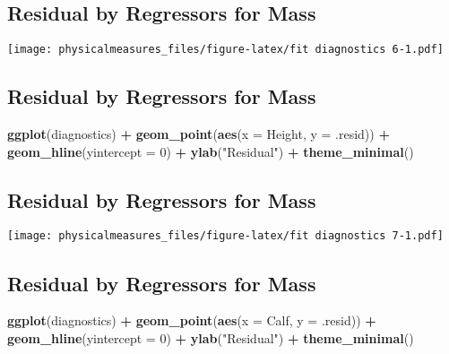 \documentclass[]{article}
\newenvironment{Shaded}{\begin{snugshade}}{\end{snugshade}}
\newcommand{\KeywordTok}[1]{\textcolor[rgb]{0.13,0.29,0.53}{\textbf{#1}}}
\newcommand{\DataTypeTok}[1]{\textcolor[rgb]{0.13,0.29,0.53}{#1}}
\newcommand{\DecValTok}[1]{\textcolor[rgb]{0.00,0.00,0.81}{#1}}
\newcommand{\StringTok}[1]{\textcolor[rgb]{0.31,0.60,0.02}{#1}}
\newcommand{\OperatorTok}[1]{\textcolor[rgb]{0.81,0.36,0.00}{\textbf{#1}}}
\newcommand{\NormalTok}[1]{#1}
\begin{document}
\subsection{Residual by Regressors for
Mass}\label{residual-by-regressors-for-mass-11}

\texttt{[image: physicalmeasures\_files/figure-latex/fit diagnostics 6-1.pdf]}

\subsection{Residual by Regressors for
Mass}\label{residual-by-regressors-for-mass-12}

\begin{Shaded}
\begin{Highlighting}[]
\KeywordTok{ggplot}\NormalTok{(diagnostics) }\OperatorTok{+}
\StringTok{  }\KeywordTok{geom_point}\NormalTok{(}\KeywordTok{aes}\NormalTok{(}\DataTypeTok{x =}\NormalTok{ Height, }\DataTypeTok{y =}\NormalTok{ .resid)) }\OperatorTok{+}
\StringTok{  }\KeywordTok{geom_hline}\NormalTok{(}\DataTypeTok{yintercept =} \DecValTok{0}\NormalTok{) }\OperatorTok{+}
\StringTok{  }\KeywordTok{ylab}\NormalTok{(}\StringTok{"Residual"}\NormalTok{) }\OperatorTok{+}
\StringTok{  }\KeywordTok{theme_minimal}\NormalTok{()}
\end{Highlighting}
\end{Shaded}

\subsection{Residual by Regressors for
Mass}\label{residual-by-regressors-for-mass-13}

\texttt{[image: physicalmeasures\_files/figure-latex/fit diagnostics 7-1.pdf]}

\subsection{Residual by Regressors for
Mass}\label{residual-by-regressors-for-mass-14}

\begin{Shaded}
\begin{Highlighting}[]
\KeywordTok{ggplot}\NormalTok{(diagnostics) }\OperatorTok{+}
\StringTok{  }\KeywordTok{geom_point}\NormalTok{(}\KeywordTok{aes}\NormalTok{(}\DataTypeTok{x =}\NormalTok{ Calf, }\DataTypeTok{y =}\NormalTok{ .resid)) }\OperatorTok{+}
\StringTok{  }\KeywordTok{geom_hline}\NormalTok{(}\DataTypeTok{yintercept =} \DecValTok{0}\NormalTok{) }\OperatorTok{+}
\StringTok{  }\KeywordTok{ylab}\NormalTok{(}\StringTok{"Residual"}\NormalTok{) }\OperatorTok{+}
\StringTok{  }\KeywordTok{theme_minimal}\NormalTok{()}
\end{Highlighting}
\end{Shaded}
\end{document}
